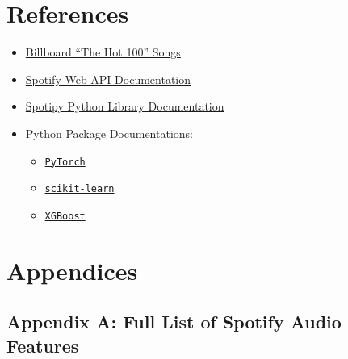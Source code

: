 \documentclass{article}
\begin{document}
\section{References}

\begin{itemize}
    \item \href{https://www.kaggle.com/datasets/dhruvildave/billboard-the-hot-100-songs}{Billboard ``The Hot 100'' Songs}
    \item \href{https://developer.spotify.com/documentation/web-api}{Spotify Web API Documentation}
    \item \href{https://spotipy.readthedocs.io/en/2.22.1/}{Spotipy Python Library Documentation}
    \item Python Package Documentations:
    \begin{itemize}
        \item \href{https://pytorch.org/docs/stable/torch.html}{\texttt{PyTorch}}
        \item \href{https://scikit-learn.org/stable/index.html}{\texttt{scikit-learn}}
        \item \href{https://xgboost.readthedocs.io/en/stable/python/python_intro.html}{\texttt{XGBoost}}
    \end{itemize}
\end{itemize}

\pagebreak

\section{Appendices}

\subsection*{Appendix A: Full List of Spotify Audio Features}\label{sec:audio_features}
\end{document}
